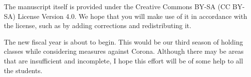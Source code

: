 The manuscript itself is provided under the Creative Commons BY-SA (CC BY-SA) License Version 4.0. We hope that you will make use of it in accordance with the license, such as by adding corrections and redistributing it.



The new fiscal year is about to begin. This would be our third season of holding classes while considering measures against Corona.
Although there may be areas that are insufficient and incomplete, I hope this effort will be of some help to all the students.




